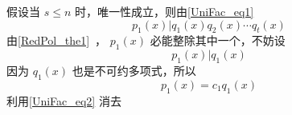  假设当 $s\leq n$ 时，唯一性成立，则由\autoref{UniFac_eq1} 
 \begin{equation}
 p_1(x)|q_1(x)q_2(x)\cdots q_t(x)
 \end{equation}
 由\autoref{RedPol_the1}~， $p_1(x)$ 必能整除其中一个，不妨设
 \begin{equation}
 p_1(x)|q_1(x)
 \end{equation}
 因为 $q_1(x)$ 也是不可约多项式，所以
 \begin{equation}\label{UniFac_eq2}
 p_1(x)=c_1q_1(x)
 \end{equation}
 利用\autoref{UniFac_eq2} 消去
